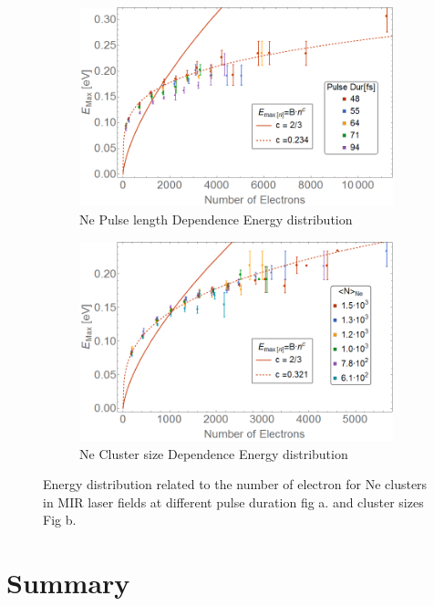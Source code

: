  \begin{figure}[h!]
\hfill
\begin{subfigure}[l]{0.46\textwidth}
\caption{Ne Pulse length Dependence Energy distribution}
\includegraphics[width=1\textwidth]{../Images/results/MIR_Ne_pulseduration/binned2.png} 
\end{subfigure} 
\begin{subfigure}[l]{0.46\textwidth}
\caption{Ne Cluster size Dependence Energy distribution}
\includegraphics[width=1\textwidth]{../Images/results/MIR_Ne_DropletSize/binned.png} 
\end{subfigure} 
\hfill
\caption[Energy-Number of electrons relation. Neon Droplets]{Energy distribution related to the number of electron for Ne clusters in MIR laser fields at different pulse duration fig a. and cluster sizes Fig b.}
\label{fig:Neenrgd}
\end{figure}

\section{Summary}

